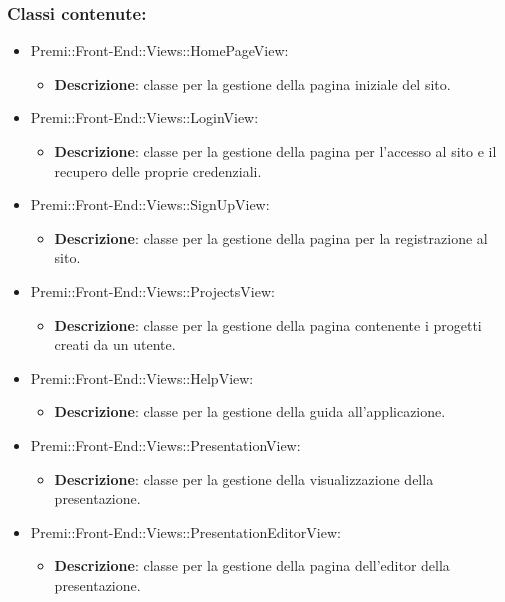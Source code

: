 \subsubsection*{Classi contenute:}
\begin{itemize}

	\item Premi::Front-End::Views::HomePageView:
	\begin{itemize}
		\item \textbf{Descrizione}: classe per la gestione della pagina iniziale del sito.
	\end{itemize}

	\item Premi::Front-End::Views::LoginView:
	\begin{itemize}
		\item \textbf{Descrizione}: classe per la gestione della pagina per l'accesso al sito e il recupero delle proprie credenziali.
	\end{itemize}

	\item Premi::Front-End::Views::SignUpView:
	\begin{itemize}
		\item \textbf{Descrizione}: classe per la gestione della pagina per la registrazione al sito.
	\end{itemize}

	\item Premi::Front-End::Views::ProjectsView:
	\begin{itemize}
		\item \textbf{Descrizione}: classe per la gestione della pagina contenente i progetti creati da un utente.
	\end{itemize}

	\item Premi::Front-End::Views::HelpView:
	\begin{itemize}
		\item \textbf{Descrizione}: classe per la gestione della guida all'applicazione.
	\end{itemize}

	\item Premi::Front-End::Views::PresentationView:
	\begin{itemize}
		\item \textbf{Descrizione}: classe per la gestione della visualizzazione della presentazione.
	\end{itemize}

	\item Premi::Front-End::Views::PresentationEditorView:
	\begin{itemize}
		\item \textbf{Descrizione}: classe per la gestione della pagina dell'editor della presentazione.
	\end{itemize}


\end{itemize}
